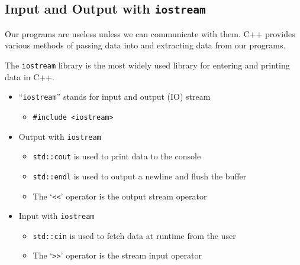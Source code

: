\documentclass{article}
\begin{document}
\subsection{Input and Output with \texttt{iostream}}

\noindent
Our programs are useless unless we can communicate with them. C++ provides various methods of passing data into and extracting data from our programs.

\noindent
The \texttt{iostream} library is the most widely used library for entering and printing data in C++.

\begin{itemize}
	\item ``\texttt{iostream}'' stands for input and output (IO) stream
	\begin{itemize}
		\item \texttt{\#include <iostream>}
	\end{itemize}
	\item Output with \texttt{iostream}
	\begin{itemize}
		\item \texttt{std::cout} is used to print data to the console
		\item \texttt{std::endl} is used to output a newline and flush the buffer
		\item The `\texttt{<<}' operator is the output stream operator
	\end{itemize}
	\item Input with \texttt{iostream}
	\begin{itemize}
		\item \texttt{std::cin} is used to fetch data at runtime from the user
		\item The `\texttt{>>}' operator is the stream input operator
	\end{itemize}
\end{itemize}


\end{document}
